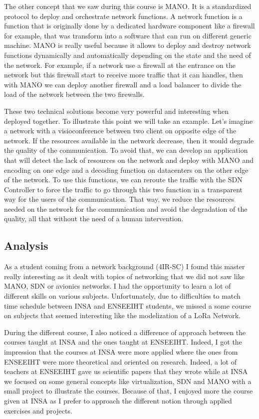 The other concept that we saw during this course is MANO. It is a standardized protocol to deploy and orchestrate network functions. A network function is a function that is originally done by a dedicated hardware component like a firewall for example, that was transform into a software that can run on different generic machine. MANO is really useful because it allows to deploy and destroy network functions dynamically and automatically depending on the state and the need of the network. For example, if a network use a firewall at the entrance on the network but this firewall start to receive more traffic that it can handles, then with MANO we can deploy another firewall and a load balancer to divide the load of the network between the two firewalls.
\\\par

These two technical solutions become very powerful and interesting when deployed together. To illustrate this point we will take an example. Let's imagine a network with a visioconference between two client on opposite edge of the network. If the resources available in the network decrease, then it would degrade the quality of the communication. To avoid that, we can develop an application that will detect the lack of resources on the network and deploy with MANO and encoding on one edge and a decoding function on datacenters on the other edge of the network. To use this functions, we can reroute the traffic with the SDN Controller to force the traffic to go through this two function in a transparent way for the users of the communication. That way, we reduce the resources needed on the network for the communication and avoid the degradation of the quality, all that without the need of a human intervention.

\subsection{Analysis}

As a student coming from a network background (4IR-SC) I found this master really interesting as it dealt with topics of networking that we did not saw like MANO, SDN or avionics networks. I had the opportunity to learn a lot of different skills on various subjects. Unfortunately, due to difficulties to match time schedule between INSA and ENSEEIHT students, we missed a some course on subjects that seemed interesting like the modelization of a LoRa Network. 
\\\par
During the different course, I also noticed a difference of approach between the courses taught at INSA and the ones taught at ENSEEIHT. Indeed, I got the impression that the courses at INSA were more applied where the ones from ENSEEIHT were more theoretical and oriented on research. Indeed, a lot of teachers at ENSEEIHT gave us scientific papers that they wrote while at INSA we focused on some general concepts like virtualization, SDN and MANO with a small project to illustrate the courses. Because of that, I enjoyed more the course given at INSA as I prefer to approach the different notion through applied exercises and projects.
